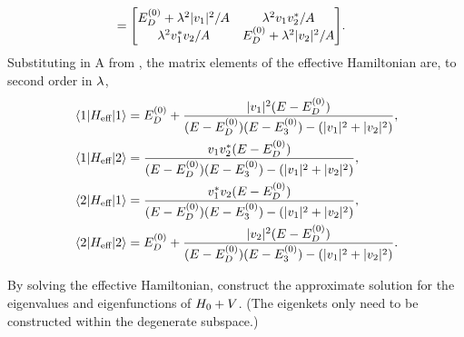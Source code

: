\begin{solution}
\begin{align*}
		&= \mqty[ \Eod + \lam^2 |\vq|^2 / A & \lam^2 \vq \vws / A \\ \lam^2 \vqs \vw / A & \Eod + \lam^2 |\vw|^2 / A ].
	\end{align*}
	Substituting in A from , the matrix elements of the effective Hamiltonian are, to second order in $\lambda$,
	\begin{align}
		\mel{1}{H_\text{eff}}{1} &= E^{(0)}_D + \frac{|v_1|^2 (E - E^{(0)}_D)}{(E - E^{(0)}_D) (E - E^{(0)}_3) - (|v_1|^2 + |v_2|^2)}, \label{mel11} \\
		\mel{1}{H_\text{eff}}{2} &= \frac{v_1 v_2^* (E - E^{(0)}_D)}{(E - E^{(0)}_D) (E - E^{(0)}_3) - (|v_1|^2 + |v_2|^2)}, \\
		\mel{2}{H_\text{eff}}{1} &= \frac{v_1^* v_2 (E - E^{(0)}_D)}{(E - E^{(0)}_D) (E - E^{(0)}_3) - (|v_1|^2 + |v_2|^2)}, \\
		\mel{2}{H_\text{eff}}{2} &= E^{(0)}_D + \frac{|v_2|^2 (E - E^{(0)}_D)}{(E - E^{(0)}_D) (E - E^{(0)}_3) - (|v_1|^2 + |v_2|^2)}. \label{mel22}
	\end{align}
\end{solution}
\vfix


\newcommand{\Esw}{E^{(2)}}
\newcommand{\Eswq}{\Esw_1}
\newcommand{\Esww}{\Esw_2}
\newcommand{\uq}{u_1}
\newcommand{\uw}{u_2}
\newcommand{\wq}{w_1}
\newcommand{\ww}{w_2}

\begin{problem}
	By solving the effective Hamiltonian, construct the approximate solution for the eigenvalues and eigenfunctions of $H_0 + V$.  (The eigenkets only need to be constructed within the degenerate subspace.)
\end{problem}

